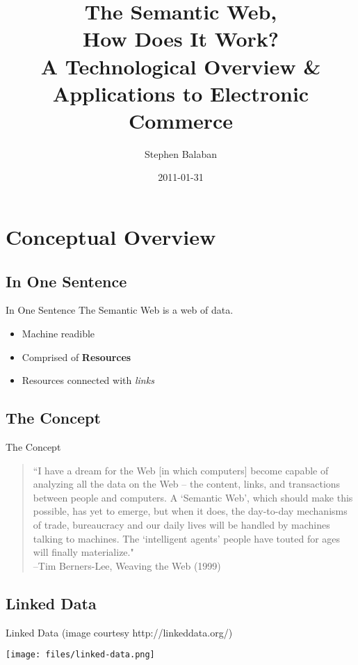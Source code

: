 \documentclass{beamer}
\title[HDIW: The Semantic Web]{The Semantic Web, \\How Does It Work?\\{\small A Technological Overview \& Applications to Electronic Commerce}}
\author{Stephen Balaban}
\institute{EECS 547}
\date{2011-01-31}
\begin{document}
\begin{frame}
\titlepage
\end{frame}


\section[Concept]{Conceptual Overview}

\subsection{In One Sentence}
\begin{frame}{In One Sentence}
The Semantic Web is
{\huge a web of data.}\\
\pause
\begin{itemize}
  \item Machine readible
  \item Comprised of \textbf{Resources}
  \item Resources connected with \textit{links}
\end{itemize}
\vfill
\end{frame}

\subsection{The Concept}
\begin{frame}{The Concept}

\vspace*{\fill} 
\begin{quote} 
``I have a dream for the Web [in which computers] become capable of analyzing all the data on the Web – the content, links, and transactions between people and computers. A ‘Semantic Web’, which should make this possible, has yet to emerge, but when it does, the day-to-day mechanisms of trade, bureaucracy and our daily lives will be handled by machines talking to machines. The ‘intelligent agents’ people have touted for ages will finally materialize."\\  \hfill--Tim Berners-Lee, Weaving the Web (1999)
\end{quote}
\vspace*{\fill}

\end{frame}

\subsection{Linked Data}
\begin{frame}{Linked Data {\tiny (image courtesy http://linkeddata.org/)}}
\begin{center}
\texttt{[image: files/linked-data.png]}
\end{center}
\end{frame}
\end{document}
